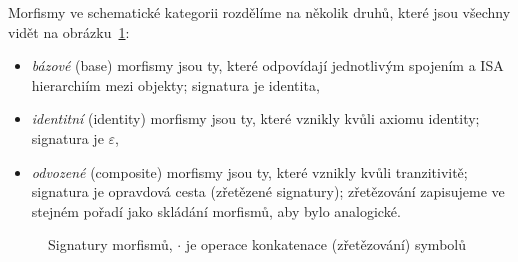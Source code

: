 Morfismy ve schematické kategorii rozdělíme na několik druhů, které jsou všechny vidět na obrázku~\ref{fig:morphism-signatures}:
\begin{itemize}
  \item \emph{bázové} (base) morfismy jsou ty, které odpovídají jednotlivým spojením a ISA hierarchiím mezi objekty; signatura je identita,
  \item \emph{identitní} (identity) morfismy jsou ty, které vznikly kvůli axiomu identity; signatura je $\varepsilon$,
  \item \emph{odvozené} (composite) morfismy jsou ty, které vznikly kvůli tranzitivitě; signatura je opravdová cesta (zřetězené signatury); zřetězování zapisujeme ve stejném pořadí jako skládání morfismů, aby bylo analogické.
\end{itemize}

\begin{figure}[!htb]
  \centering
  \caption{Signatury morfismů, $\cdot$ je operace konkatenace (zřetězování) symbolů}
  \label{fig:morphism-signatures}
\end{figure}

% 
